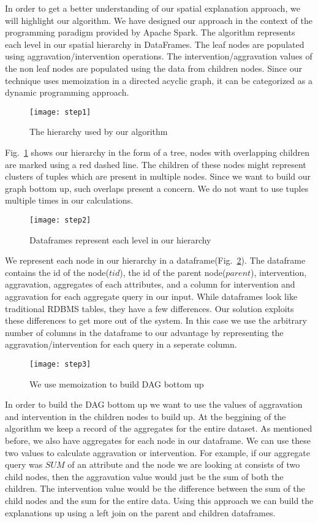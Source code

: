 In order to get a better understanding of our spatial explanation approach, we will highlight our algorithm. We have designed our approach in the context of the programming paradigm provided by Apache Spark. The algorithm represents each level in our spatial hierarchy in DataFrames. The leaf nodes are populated using aggravation/intervention operations. The intervention/aggravation values of the non leaf nodes are populated using the data from children nodes. Since our technique uses memoization in a directed acyclic graph, it can be categorized as a dynamic programming approach.

\begin{figure}[h]
\texttt{[image: step1]}
\caption{The hierarchy used by our algorithm}
\label{fig:step1}
\end{figure}

Fig.~\ref{fig:step1} shows our hierarchy in the form of a tree, nodes with overlapping children are marked using a red dashed line. The children of these nodes might represent clusters of tuples which are present in multiple nodes. Since we want to build our graph bottom up, such overlaps present a concern. We do not want to use tuples multiple times in our calculations.

\begin{figure}[h]
\texttt{[image: step2]}
\caption{Dataframes represent each level in our hierarchy}
\label{fig:step2}
\end{figure}

We represent each node in our hierarchy in a dataframe(Fig.~\ref{fig:step2}). The dataframe contains the id of the node($tid$), the id of the parent node($parent$), intervention, aggravation, aggregates of each attributes, and a column for intervention and aggravation for each aggregate query in our input. While dataframes look like traditional RDBMS tables, they have a few differences. Our solution exploits these differences to get more out of the system. In this case we use the arbitrary number of columns in the dataframe to our advantage by representing the aggravation/intervention for each query in a seperate column.

\begin{figure}[h]
\texttt{[image: step3]}
\caption{We use memoization to build DAG bottom up}
\label{fig:step3}
\end{figure}

In order to build the DAG bottom up we want to use the values of aggravation and intervention in the children nodes to build up. At the beggining of the algorithm we keep a record of the aggregates for the entire dataset. As mentioned before, we also have aggregates for each node in our dataframe. We can use these two values to calculate aggravation or intervention. For example, if our aggregate query was $SUM$ of an attribute and the node we are looking at consists of two child nodes, then the aggravation value would just be the sum of both the children. The intervention value would be the difference between the sum of the child nodes and the sum for the entire data. Using this approach we can build the explanations up using a left join on the parent and children dataframes.

